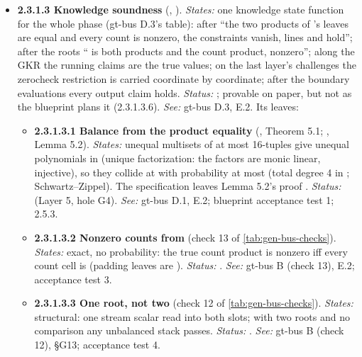 \begin{itemize}[label={}, leftmargin=1.3em, itemindent=-1.3em, labelwidth=0pt, labelsep=0pt, itemsep=4pt, topsep=3pt]
\item {}\label{obl:node-2.3.1.3}\textbf{2.3.1.3 Knowledge soundness} (, ). \emph{States:} one knowledge state function for the whole phase (gt-bus D.3's table): after  ``the two products of 's leaves are equal and every count is nonzero, the constraints vanish, lines and  hold''; after the roots `` is both products and  the count product, nonzero''; along the GKR the running claims are the true values; on the last layer's challenges the zerocheck restriction  is carried coordinate by coordinate; after the boundary evaluations every output claim holds. \emph{Status:} ; provable on paper, but not as the blueprint plans it (2.3.1.3.6). \emph{See:} gt-bus D.3, E.2. Its leaves:
\begin{itemize}[label={}, leftmargin=1.3em, itemindent=-1.3em, labelwidth=0pt, labelsep=0pt, itemsep=4pt, topsep=3pt]
\item {}\label{obl:node-2.3.1.3.1}\textbf{2.3.1.3.1 Balance from the product equality} (, Theorem 5.1; , Lemma 5.2). \emph{States:} unequal multisets of at most  16-tuples give unequal polynomials in  (unique factorization: the factors  are monic linear,  injective), so they collide at  with probability at most  (total degree 4 in ; Schwartz–Zippel). The specification leaves Lemma 5.2's proof . \emph{Status:}  (Layer 5, hole G4). \emph{See:} gt-bus D.1, E.2; blueprint acceptance test 1; 2.5.3.
\item {}\label{obl:node-2.3.1.3.2}\textbf{2.3.1.3.2 Nonzero counts from } (check 13 of \cref{tab:gen-bus-checks}). \emph{States:} exact, no probability: the true count product is nonzero iff every count cell is (padding leaves are ). \emph{Status:} . \emph{See:} gt-bus B (check 13), E.2; acceptance test 3.
\item {}\label{obl:node-2.3.1.3.3}\textbf{2.3.1.3.3 One root, not two} (check 12 of \cref{tab:gen-bus-checks}). \emph{States:} structural: one stream scalar read into both slots; with two roots and no comparison any unbalanced stack passes. \emph{Status:} . \emph{See:} gt-bus B (check 12), §G13; acceptance test 4.

\end{itemize}
\end{itemize}
